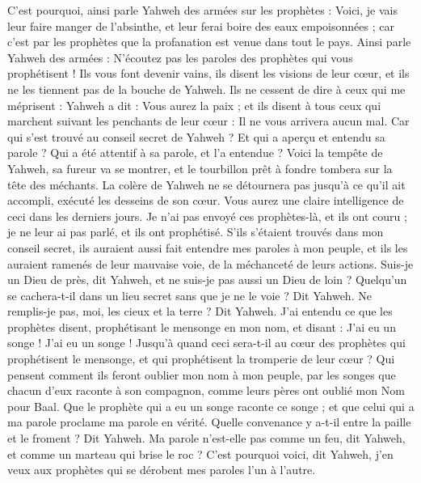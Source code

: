 \begin{multicols}{2}
C'est pourquoi, ainsi parle Yahweh des armées sur les prophètes : Voici, je vais leur faire manger de l'absinthe, et leur ferai boire des eaux empoisonnées ; car c'est par les prophètes que la profanation est venue dans tout le pays.
Ainsi parle Yahweh des armées : N'écoutez pas les paroles des prophètes qui vous prophétisent ! Ils vous font devenir vains, ils disent les visions de leur cœur, et ils ne les tiennent pas de la bouche de Yahweh.
Ils ne cessent de dire à ceux qui me méprisent : Yahweh a dit : Vous aurez la paix ; et ils disent à tous ceux qui marchent suivant les penchants de leur cœur : Il ne vous arrivera aucun mal.
Car qui s'est trouvé au conseil secret de Yahweh ? Et qui a aperçu et entendu sa parole ? Qui a été attentif à sa parole, et l'a entendue ?
Voici la tempête de Yahweh, sa fureur va se montrer, et le tourbillon prêt à fondre tombera sur la tête des méchants.
La colère de Yahweh ne se détournera pas jusqu'à ce qu'il ait accompli, exécuté les desseins de son cœur. Vous aurez une claire intelligence de ceci dans les derniers jours.
Je n'ai pas envoyé ces prophètes-là, et ils ont couru ; je ne leur ai pas parlé, et ils ont prophétisé.
S'ils s'étaient trouvés dans mon conseil secret, ils auraient aussi fait entendre mes paroles à mon peuple, et ils les auraient ramenés de leur mauvaise voie, de la méchanceté de leurs actions.
Suis-je un Dieu de près, dit Yahweh, et ne suis-je pas aussi un Dieu de loin ?
Quelqu'un se cachera-t-il dans un lieu secret sans que je ne le voie ? Dit Yahweh. Ne remplis-je pas, moi, les cieux et la terre ? Dit Yahweh.
J'ai entendu ce que les prophètes disent, prophétisant le mensonge en mon nom, et disant : J'ai eu un songe ! J'ai eu un songe !
Jusqu'à quand ceci sera-t-il au cœur des prophètes qui prophétisent le mensonge, et qui prophétisent la tromperie de leur cœur ?
Qui pensent comment ils feront oublier mon nom à mon peuple, par les songes que chacun d'eux raconte à son compagnon, comme leurs pères ont oublié mon Nom pour Baal.
Que le prophète qui a eu un songe raconte ce songe ; et que celui qui a ma parole proclame ma parole en vérité. Quelle convenance y a-t-il entre la paille et le froment ? Dit Yahweh.
Ma parole n'est-elle pas comme un feu, dit Yahweh, et comme un marteau qui brise le roc ?
C'est pourquoi voici, dit Yahweh, j'en veux aux prophètes qui se dérobent mes paroles l'un à l'autre.

\end{multicols}
